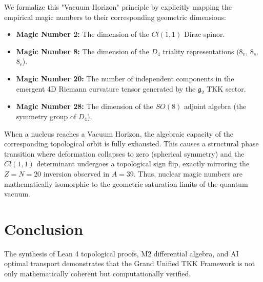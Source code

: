 \documentclass[11pt,a4paper]{article}
\begin{document}
We formalize this "Vacuum Horizon" principle by explicitly mapping the empirical magic numbers to their corresponding geometric dimensions:
\begin{itemize}
    \item \textbf{Magic Number 2:} The dimension of the $Cl(1,1)$ Dirac spinor.
    \item \textbf{Magic Number 8:} The dimension of the $D_4$ triality representations ($8_v$, $8_s$, $8_c$).
    \item \textbf{Magic Number 20:} The number of independent components in the emergent 4D Riemann curvature tensor generated by the $\mathfrak{g}_2$ TKK sector.
    \item \textbf{Magic Number 28:} The dimension of the $SO(8)$ adjoint algebra (the symmetry group of $D_4$).
\end{itemize}
When a nucleus reaches a Vacuum Horizon, the algebraic capacity of the corresponding topological orbit is fully exhausted. This causes a structural phase transition where deformation collapses to zero (spherical symmetry) and the $Cl(1,1)$ determinant undergoes a topological sign flip, exactly mirroring the $Z=N=20$ inversion observed in $A=39$. Thus, nuclear magic numbers are mathematically isomorphic to the geometric saturation limits of the quantum vacuum.

\section{Conclusion}
The synthesis of Lean 4 topological proofs, M2 differential algebra, and AI optimal transport demonstrates that the Grand Unified TKK Framework is not only mathematically coherent but computationally verified.
\end{document}
